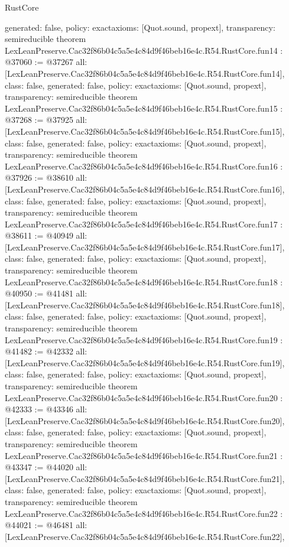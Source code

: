 \begin{lexlean}{RustCore}
\begin{coremodule}
{  generated: false,
  policy: exact{axioms: [Quot.sound, propext]},
  transparency: semireducible
}
theorem LexLeanPreserve.Cac32f86b04c5a5e4c84d9f46beb16e4c.R54.RustCore.fun14 : @37060 := @37267 {
  all: [LexLeanPreserve.Cac32f86b04c5a5e4c84d9f46beb16e4c.R54.RustCore.fun14],
  class: false,
  generated: false,
  policy: exact{axioms: [Quot.sound, propext]},
  transparency: semireducible
}
theorem LexLeanPreserve.Cac32f86b04c5a5e4c84d9f46beb16e4c.R54.RustCore.fun15 : @37268 := @37925 {
  all: [LexLeanPreserve.Cac32f86b04c5a5e4c84d9f46beb16e4c.R54.RustCore.fun15],
  class: false,
  generated: false,
  policy: exact{axioms: [Quot.sound, propext]},
  transparency: semireducible
}
theorem LexLeanPreserve.Cac32f86b04c5a5e4c84d9f46beb16e4c.R54.RustCore.fun16 : @37926 := @38610 {
  all: [LexLeanPreserve.Cac32f86b04c5a5e4c84d9f46beb16e4c.R54.RustCore.fun16],
  class: false,
  generated: false,
  policy: exact{axioms: [Quot.sound, propext]},
  transparency: semireducible
}
theorem LexLeanPreserve.Cac32f86b04c5a5e4c84d9f46beb16e4c.R54.RustCore.fun17 : @38611 := @40949 {
  all: [LexLeanPreserve.Cac32f86b04c5a5e4c84d9f46beb16e4c.R54.RustCore.fun17],
  class: false,
  generated: false,
  policy: exact{axioms: [Quot.sound, propext]},
  transparency: semireducible
}
theorem LexLeanPreserve.Cac32f86b04c5a5e4c84d9f46beb16e4c.R54.RustCore.fun18 : @40950 := @41481 {
  all: [LexLeanPreserve.Cac32f86b04c5a5e4c84d9f46beb16e4c.R54.RustCore.fun18],
  class: false,
  generated: false,
  policy: exact{axioms: [Quot.sound, propext]},
  transparency: semireducible
}
theorem LexLeanPreserve.Cac32f86b04c5a5e4c84d9f46beb16e4c.R54.RustCore.fun19 : @41482 := @42332 {
  all: [LexLeanPreserve.Cac32f86b04c5a5e4c84d9f46beb16e4c.R54.RustCore.fun19],
  class: false,
  generated: false,
  policy: exact{axioms: [Quot.sound, propext]},
  transparency: semireducible
}
theorem LexLeanPreserve.Cac32f86b04c5a5e4c84d9f46beb16e4c.R54.RustCore.fun20 : @42333 := @43346 {
  all: [LexLeanPreserve.Cac32f86b04c5a5e4c84d9f46beb16e4c.R54.RustCore.fun20],
  class: false,
  generated: false,
  policy: exact{axioms: [Quot.sound, propext]},
  transparency: semireducible
}
theorem LexLeanPreserve.Cac32f86b04c5a5e4c84d9f46beb16e4c.R54.RustCore.fun21 : @43347 := @44020 {
  all: [LexLeanPreserve.Cac32f86b04c5a5e4c84d9f46beb16e4c.R54.RustCore.fun21],
  class: false,
  generated: false,
  policy: exact{axioms: [Quot.sound, propext]},
  transparency: semireducible
}
theorem LexLeanPreserve.Cac32f86b04c5a5e4c84d9f46beb16e4c.R54.RustCore.fun22 : @44021 := @46481 {
  all: [LexLeanPreserve.Cac32f86b04c5a5e4c84d9f46beb16e4c.R54.RustCore.fun22],
}
\end{coremodule}
\end{lexlean}
